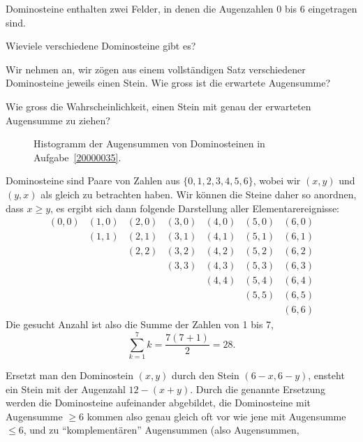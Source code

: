 Dominosteine enthalten zwei Felder, in denen die Augenzahlen
0 bis 6 eingetragen sind.
\begin{teilaufgaben}
\item Wieviele verschiedene Dominosteine gibt es?
\item Wir nehmen an, wir zögen aus einem vollständigen Satz verschiedener
Dominosteine jeweils einen Stein.
Wie gross ist die erwartete Augensumme?
\item
Wie gross die Wahrscheinlichkeit, einen Stein mit genau der
erwarteten Augensumme zu ziehen?
\end{teilaufgaben}


\begin{loesung}
\begin{figure}
\centering
{}
\caption{Histogramm der Augensummen von Dominosteinen in Aufgabe~\ref{20000035}.
\label{20000035:histogram}}
\end{figure}
\begin{teilaufgaben}
\item Dominosteine sind Paare von Zahlen aus $\{0,1,2,3,4,5,6\}$, wobei
wir $(x,y)$ und $(y,x)$ als gleich zu betrachten haben. Wir können die
Steine daher so anordnen, dass $x\ge y$, es ergibt sich dann folgende
Darstellung aller Elementarereignisse:
\[
\begin{matrix}
(0,0)&(1,0)&(2,0)&(3,0)&(4,0)&(5,0)&(6,0)\\
     &(1,1)&(2,1)&(3,1)&(4,1)&(5,1)&(6,1)\\
     &     &(2,2)&(3,2)&(4,2)&(5,2)&(6,2)\\
     &     &     &(3,3)&(4,3)&(5,3)&(6,3)\\
     &     &     &     &(4,4)&(5,4)&(6,4)\\
     &     &     &     &     &(5,5)&(6,5)\\
     &     &     &     &     &     &(6,6)
\end{matrix}
\]
Die gesucht Anzahl ist also die Summe der Zahlen von 1 bis 7,
\[
\sum_{k=1}^7k=\frac{7(7+1)}2=28.
\]
\item Ersetzt man den Dominostein $(x,y)$ durch den Stein $(6-x,6-y)$,
ensteht ein Stein mit der Augenzahl $12-(x+y)$. Durch die genannte
Ersetzung werden die Dominosteine aufeinander abgebildet, die Dominosteine
mit Augensumme $\ge6$ kommen also genau gleich oft vor wie jene mit
Augensumme $\le6$, und zu ``komplementären'' Augensummen (also Augensummen,

\end{teilaufgaben}
\end{loesung}
